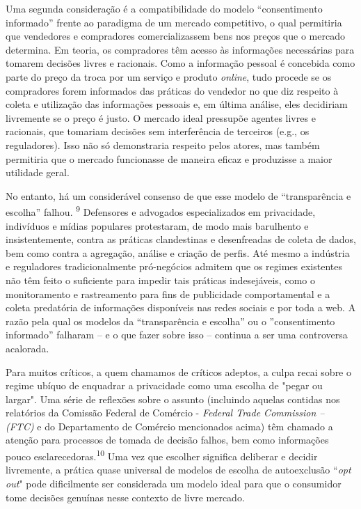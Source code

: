 Uma segunda consideração é a compatibilidade do modelo ``consentimento
informado'' frente ao paradigma de um mercado competitivo, o qual
permitiria que vendedores e compradores comercializassem bens nos preços
que o mercado determina. Em teoria, os compradores têm acesso às
informações necessárias para tomarem decisões livres e racionais. Como a
informação pessoal é concebida como parte do preço da troca por um
serviço e produto \emph{online}, tudo procede se os compradores forem
informados das práticas do vendedor no que diz respeito à coleta e
utilização das informações pessoais e, em última análise, eles
decidiriam livremente se o preço é justo. O mercado ideal pressupõe
agentes livres e racionais, que tomariam decisões sem interferência de
terceiros (e.g., os reguladores). Isso não só demonstraria respeito
pelos atores, mas também permitiria que o mercado funcionasse de maneira
eficaz e produzisse a maior utilidade geral.

No entanto, há um considerável consenso de que esse modelo de
``transparência e escolha'' falhou. \textsuperscript{{9}} Defensores e
advogados especializados em privacidade, indivíduos e mídias populares
protestaram, de modo mais barulhento e insistentemente, contra as
práticas clandestinas e desenfreadas de coleta de dados, bem como contra
a agregação, análise e criação de perfis. Até mesmo a indústria e
reguladores tradicionalmente pró-negócios admitem que os regimes
existentes não têm feito o suficiente para impedir tais práticas
indesejáveis, como o monitoramento e rastreamento para fins de
publicidade comportamental e a coleta predatória de informações
disponíveis nas redes sociais e por toda a web. A razão pela qual os
modelos da ``transparência e escolha'' ou o ''consentimento informado''
falharam -- e o que fazer sobre isso -- continua a ser uma controversa
acalorada.

Para muitos críticos, a quem chamamos de críticos adeptos, a culpa recai
sobre o regime ubíquo de enquadrar a privacidade como uma escolha de
"pegar ou largar". Uma série de reflexões sobre o assunto (incluindo
aquelas contidas nos relatórios da Comissão Federal de Comércio -
\emph{Federal Trade Commission -- (FTC)} e do Departamento de Comércio
mencionados acima) têm chamado a atenção para processos de tomada de
decisão falhos, bem como informações pouco
esclarecedoras.\textsuperscript{{10}} Uma vez que escolher significa
deliberar e decidir livremente, a prática quase universal de modelos de
escolha de autoexclusão ``\emph{opt out}" pode dificilmente ser
considerada um modelo ideal para que o consumidor tome decisões genuínas
nesse contexto de livre mercado.

